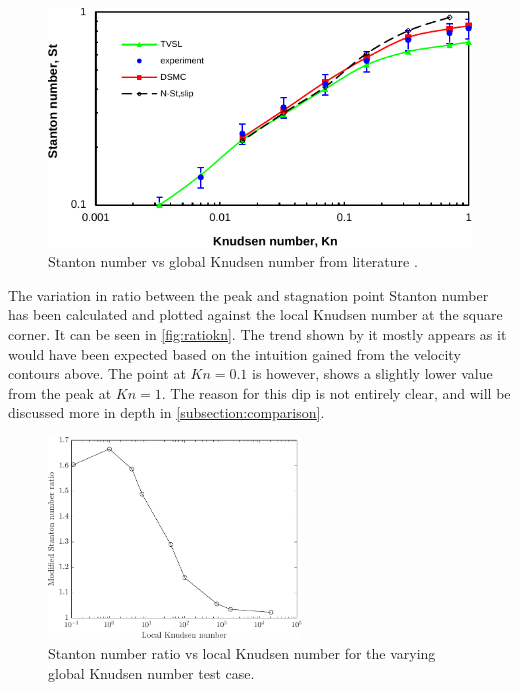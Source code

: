 \begin{figure}
    \centering
    \includegraphics{Images/4. Results/riabov.pdf}
    \caption{Stanton number vs global Knudsen number from literature \cite{riabov}.}
    \label{fig:riabov}
\end{figure}

The variation in ratio between the peak and stagnation point Stanton number has been calculated and plotted against the local Knudsen number at the square corner. It can be seen in \autoref{fig:ratiokn}. The trend shown by it mostly appears as it would have been expected based on the intuition gained from the velocity contours above. The point at $Kn = 0.1$ is however, shows a slightly lower value from the peak at $Kn = 1$. The reason for this dip is not entirely clear, and will be discussed more in depth in \autoref{subsection:comparison}.

\begin{figure}
    \centering
    \includegraphics[width=0.6\textwidth]{Images/4. Results/Square Kn/stratiolocalkn.pdf}
    \caption{Stanton number ratio vs local Knudsen number for the varying global Knudsen number test case.}
    \label{fig:ratiokn}
\end{figure}

